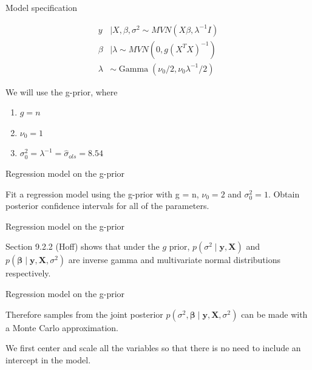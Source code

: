 \documentclass[ignorenonframetext,]{beamer}
\DeclareMathOperator*{\Ga}{Gamma}
\begin{document}
\begin{frame}{Model specification}

\begin{align}
y &\mid X,\beta, \sigma^2 \sim MVN( X\beta, \lambda^{-1} I) \\
\beta &\mid \lambda \sim MVN(0, g (X^TX)^{-1})\\
\lambda &\sim \Ga(\nu_0/2,\nu_0 \lambda^{-1}/2)
\end{align}

We will use the g-prior, where

\begin{enumerate}
\item $g=n$
\item $\nu_0 = 1$
\item $\sigma_0^2 = \lambda^{-1} = \hat{\sigma}_{ols} = 8.54$
\end{enumerate}

\end{frame}

\begin{frame}{Regression model on the g-prior}

Fit a regression model using the g-prior with g = n, \(\nu_0 = 2\) and
\(\sigma_0^2 = 1.\) Obtain posterior confidence intervals for all of the
parameters.

\end{frame}

\begin{frame}{Regression model on the g-prior}

Section 9.2.2 (Hoff) shows that under the \(g\) prior,
\(p(\sigma^{2}\mid\boldsymbol{y},\boldsymbol{X})\) and
\(p(\boldsymbol{\beta}\mid\boldsymbol{y},\boldsymbol{X},\sigma^{2})\)
are inverse gamma and multivariate normal distributions respectively.

\end{frame}

\begin{frame}{Regression model on the g-prior}

Therefore samples from the joint posterior
\(p(\sigma^{2},\boldsymbol{\beta}\mid\boldsymbol{y},\boldsymbol{X},\sigma^{2})\)
can be made with a Monte Carlo approximation.

We first center and scale all the variables so that there is no need to
include an intercept in the model.

\end{frame}
\end{document}
